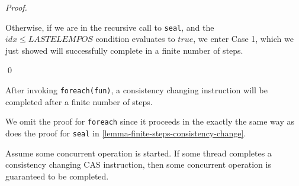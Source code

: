 \documentclass[runningheads,a4paper]{llncs}
\begin{document}
\begin{proof}
\begin{itemize}



Otherwise, if we are in the recursive call to \verb=seal=, and the $idx \leq LASTELEMPOS$ 
condition evaluates to $true$, we enter Case 1, which we just
showed will successfully complete in a finite number of steps.

\end{itemize}
\qed
\end{proof}


\begin{lemma}[Foreach]\label{lemma-foreach-cons}
After invoking \verb=foreach(fun)=, a consistency changing instruction will
be completed after a finite number of steps.
\end{lemma}

We omit the proof for \verb=foreach= since it proceeds in the exactly the same way
as does the proof for \verb=seal= in 
\ref{lemma-finite-steps-consistency-change}.


\begin{lemma}\label{lemma-operation-completes}
Assume some concurrent operation is started. If some thread completes
a consistency changing CAS instruction, then some concurrent operation is
guaranteed to be completed.
\end{lemma}
\end{document}
